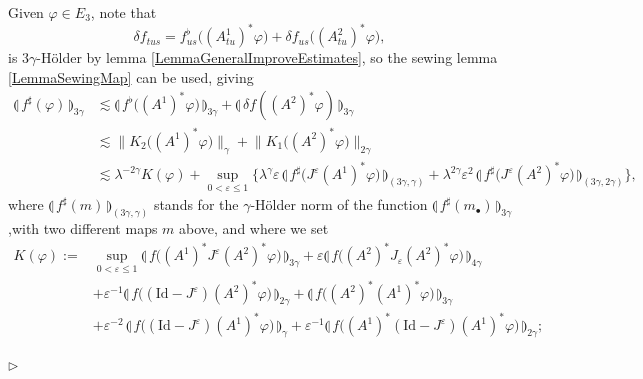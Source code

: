 \documentclass[11pt,a4paper]{amsart}
\renewcommand{\leq}{\leqslant}
\newcommand{\ssk}{\smallskip}
\numberwithin{equation}{section} %
\newenvironment{Dem}{%
    \begin{list}{\hspace{0.5cm}{\sc Proof --}}{%
        \setlength{\topsep}{0pt}%
        \setlength{\leftmargin}{0pt}%
        \setlength{\rightmargin}{0pt}%
        \setlength{\listparindent}{0pt}%
        \setlength{\itemindent}{0pt}%
        \setlength{\parsep}{0pt}%
        \addtolength{\leftmargin}{20pt}%
        \addtolength{\rightmargin}{0pt}%
    } \item }{\hfill{\space $\rhd$}\end{list}\smallskip}
\begin{document}
\ssk

\begin{Dem}
Given $\varphi\in E_3$, note that
$$
\delta f_{tus} = f^\flat_{us}\big((A^1_{tu})^*\varphi\big) + \delta f_{us}\big((A^2_{tu})^*\varphi\big),
$$
is $3\gamma$-H\"older by lemma \ref{LemmaGeneralImproveEstimates}, so the sewing lemma \ref{LemmaSewingMap} can be used, giving
\begin{equation*}
\begin{split}
\llparenthesis\, f^\sharp(\varphi)\,\rrparenthesis_{3\gamma} 
&\lesssim \llparenthesis\,  f^\flat \big((A^1)^*\varphi\big) \,\rrparenthesis_{3\gamma} +  \llparenthesis\,  \delta f ((A^2)^*\varphi) \,\rrparenthesis_{3\gamma}\\
&\lesssim  \Big\|  K_2\big((A^1)^*\varphi\big) \Big\|_\gamma +  \Big\|  K_1\big((A^2)^*\varphi\big)\Big\|_{2\gamma}\\
&\lesssim \lambda^{-2\gamma}  K(\varphi) + \sup_{0<\varepsilon\leq 1} \Big\{  \lambda^{\gamma} \varepsilon\, \llparenthesis\,  f^\sharp\big(J^\varepsilon (A^1)^*\varphi\big) \,\rrparenthesis_{(3\gamma,\gamma)} + \lambda^{2\gamma}\varepsilon^2\, \llparenthesis\,  f^\sharp\big(J^\varepsilon (A^2)^*\varphi\big) \,\rrparenthesis_{(3\gamma,2\gamma)} \Big\},
\end{split}
\end{equation*}
where $\llparenthesis\,  f^\sharp(m) \,\rrparenthesis_{(3\gamma,\gamma)}$ stands for the $\gamma$-H\"older norm of the function $\llparenthesis\,  f^\sharp(m_\bullet) \,\rrparenthesis_{3\gamma}$,with two different maps $m$ above, and where we set
\begin{equation*}
\begin{split}
K(\varphi) := &\sup_{0<\varepsilon\leq 1}  \llparenthesis\, f\big((A^1)^* J^\varepsilon  (A^2)^*\varphi\big)\,\rrparenthesis_{3\gamma} + \varepsilon \llparenthesis\, f\big((A^2)^* J_\varepsilon  (A^2)^*\varphi \big)\,\rrparenthesis_{4\gamma} \\ &
+ \varepsilon^{-1} \llparenthesis\, f\big((\textrm{Id}-J^\varepsilon) (A^2)^*\varphi\big) \,\rrparenthesis_{2\gamma} + \llparenthesis\, f\big((A^2)^* (A^1)^*\varphi\big)\,\rrparenthesis_{3\gamma} \\
&+\varepsilon^{-2}\,\llparenthesis\, f\big((\textrm{Id}-J^\varepsilon) (A^1)^*\varphi\big) \,\rrparenthesis_\gamma +\varepsilon^{-1} \llparenthesis\, f\big((A^1)^*(\textrm{Id}-J^\varepsilon) (A^1)^*\varphi\big) \,\rrparenthesis_{2\gamma};
\end{split}
\end{equation*}

\end{Dem}
\end{document}
